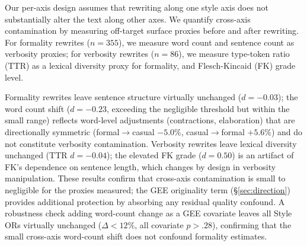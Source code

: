 Our per-axis design assumes that rewriting along one style axis does not substantially alter the text along other axes.
We quantify cross-axis contamination by measuring off-target surface proxies before and after rewriting.
For formality rewrites ($n = 355$), we measure word count and sentence count as verbosity proxies; for verbosity rewrites ($n = 86$), we measure type-token ratio (TTR) as a lexical diversity proxy for formality, and Flesch-Kincaid (FK) grade level.

\begin{table}[h]
\centering
\small
\caption{Cross-axis contamination: effect of rewriting along one style axis on surface proxies of the other axis. Cohen's $d$: $|d| < 0.20$ negligible, $0.20$--$0.50$ small contamination \citep{cohen1988statistical}.}
\label{tab:cross_axis}
\end{table}

Formality rewrites leave sentence structure virtually unchanged ($d = -0.03$); the word count shift ($d = -0.23$, exceeding the negligible threshold but within the small range) reflects word-level adjustments (contractions, elaboration) that are directionally symmetric (formal$\to$casual $-5.0\%$, casual$\to$formal $+5.6\%$) and do not constitute verbosity contamination.
Verbosity rewrites leave lexical diversity unchanged (TTR $d = -0.04$); the elevated FK grade ($d = 0.50$) is an artifact of FK's dependence on sentence length, which changes by design in verbosity manipulation.
These results confirm that cross-axis contamination is small to negligible for the proxies measured; the GEE originality term (\S\ref{sec:direction}) provides additional protection by absorbing any residual quality confound.
A robustness check adding word-count change as a GEE covariate leaves all Style ORs virtually unchanged ($\Delta < 12\%$, all covariate $p > .28$), confirming that the small cross-axis word-count shift does not confound formality estimates.

